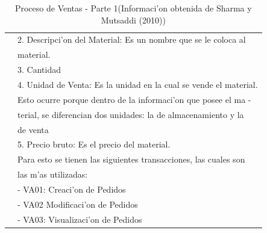\begin{table}[H]
\begin{tabular}{|l|l|}
															 & 2. Descripci'on del Material: Es un nombre que se le coloca al\\
															 & material.\\
															 & 3. Cantidad\\
															 & 4. Unidad de Venta: Es la unidad en la cual se vende el material.\\
															 &  Esto ocurre porque dentro de la informaci'on que posee el ma -\\
															 & terial, se diferencian dos unidades: la de almacenamiento y la \\
															 & de venta \\
															 & 5. Precio bruto: Es el precio del material. \\
															 & Para esto se tienen las siguientes transacciones, las cuales son \\
															 & las m'as utilizadas:\\
															 & - VA01: Creaci'on de Pedidos \\
															 & - VA02 Modificaci'on de Pedidos \\
														     & - VA03: Visualizaci'on de Pedidos \\
\hline
\end{tabular}
\caption{Proceso de Ventas - Parte 1(Informaci'on obtenida de Sharma y Mutsaddi (2010))}
\label{tb:procesoventas}
\end{table}
